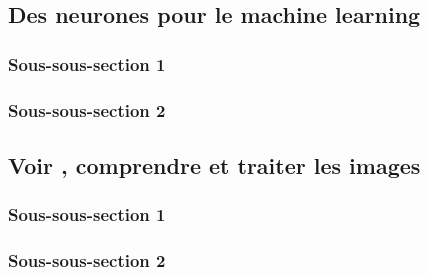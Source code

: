 
\subsection{Des \og neurones \fg pour le machine learning}
    \subsubsection{Sous-sous-section 1}
    
    \subsubsection{Sous-sous-section 2}

    
    \subsection{\og Voir \fg, comprendre et traiter les images}
        \subsubsection{Sous-sous-section 1}


        \subsubsection{Sous-sous-section 2}

